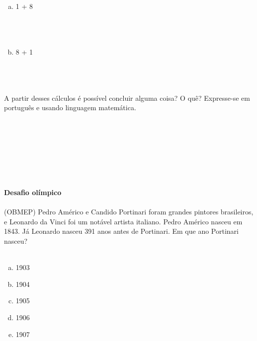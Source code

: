 \documentclass[a4paper,14pt]{article}
\begin{document}
\begin{multicols}{2}
\begin{enumerate}
\begin{enumerate}[a)]
    			\item 1 + 8 \\\\\\\\
    			\item 8 + 1 \\\\\\\\
    		\end{enumerate}
    		A partir desses cálculos é possível concluir alguma coisa? O quê? Expresse-se em português e usando linguagem matemática. \\\\\\\\\\\\\\\\
    	\end{enumerate}
    	\textbf{Desafio olímpico} \\\\
    	(OBMEP) Pedro Américo e Candido Portinari foram grandes pintores brasileiros, e Leonardo da Vinci foi um notável artista italiano. Pedro Américo nasceu em 1843. Já Leonardo nasceu 391 anos antes de Portinari. Em que ano Portinari nasceu? \\\\
    	\begin{enumerate}[a)]
    		\item 1903
    		\item 1904
    		\item 1905
    		\item 1906
    		\item 1907
    	\end{enumerate}
    	$~$ \\ $~$ \\ $~$ \\ $~$ \\ $~$ \\ $~$ \\ $~$ \\ $~$ \\ $~$ \\ $~$ \\ $~$ \\ $~$ \\ $~$ \\ $~$ \\ $~$ \\ $~$ \\ $~$ \\ $~$ \\ $~$ \\ $~$ \\ $~$ \\
	\end{multicols}
\end{document}
